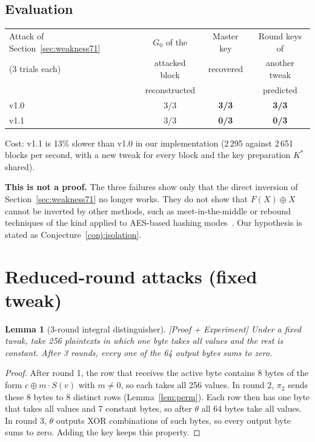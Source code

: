 \documentclass[11pt,a4paper]{article}
\newtheorem{lemma}{Lemma}
\newcommand{\ev}[1]{\textup{\textsf{[#1]}}}
\begin{document}
\subsection{Evaluation}

\begin{center}\small
\begin{tabular}{@{}lccc@{}}
\toprule
Attack of Section~\ref{sec:weakness71} & $G_0$ of the & Master key & Round keys of\\
(3 trials each) & attacked block & recovered & another tweak\\
 & reconstructed & & predicted\\
\midrule
v1.0 & 3/3 & \textbf{3/3} & \textbf{3/3}\\
v1.1 & 3/3 & \textbf{0/3} & \textbf{0/3}\\
\bottomrule
\end{tabular}
\end{center}

Cost: v1.1 is 13\% slower than v1.0 in our implementation (2\,295 against 2\,651 blocks per second, with a new
tweak for every block and the key preparation $K^*$ shared).

\textbf{This is not a proof.} The three failures show only that the direct inversion of Section~\ref{sec:weakness71} no longer
works. They do not show that $F(X) \oplus X$ cannot be inverted by other methods, such as meet-in-the-middle or
rebound techniques of the kind applied to AES-based hashing modes~\cite{Sas11}. Our hypothesis is stated as
Conjecture~\ref{conj:isolation}.

\section{Reduced-round attacks (fixed tweak)}\label{sec:attacks}

\begin{lemma}[3-round integral distinguisher]\label{lem:integral}
\ev{Proof + Experiment} Under a fixed tweak, take 256 plaintexts in which one byte takes all values and the rest is
constant. After 3 rounds, every one of the 64 output bytes sums to zero.
\end{lemma}

\begin{proof}
After round 1, the row that receives the active byte contains 8 bytes of the form $c \oplus m\cdot S(v)$ with
$m \ne 0$, so each takes all 256 values. In round 2, $\pi_2$ sends these 8 bytes to 8 distinct rows
(Lemma~\ref{lem:perm}). Each row then has one byte that takes all values and 7 constant bytes, so after $\theta$ all
64 bytes take all values. In round 3, $\theta$ outputs XOR combinations of such bytes, so every output byte sums to
zero. Adding the key keeps this property.
\end{proof}
\end{document}
